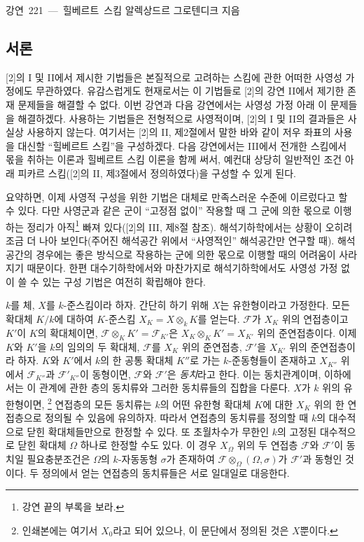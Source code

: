 \unit{강연 221 — 힐베르트 스킴}
%
  {알렉상드르 그로텐디크 지음}

\subsection*{서론}

[2]의 I 및 II에서 제시한 기법들은 본질적으로 고려하는 스킴에 관한
어떠한 사영성 가정에도 무관하였다. 유감스럽게도 현재로서는 이 기법들로
[2]의 강연 II에서 제기한 존재 문제들을 해결할 수 없다. 이번 강연과
다음 강연에서는 사영성 가정 아래 이 문제들을 해결하겠다. 사용하는
기법들은 전형적으로 사영적이며, [2]의 I 및 II의 결과들은 사실상 사용하지
않는다. 여기서는 [2]의 II, 제2절에서 말한 바와 같이 저우 좌표의 사용을
대신할 ``힐베르트 스킴''을 구성하겠다. 다음 강연에서는 III에서 전개한
스킴에서 몫을 취하는 이론과 힐베르트 스킴 이론을 함께 써서, 예컨대
상당히 일반적인 조건 아래 피카르 스킴([2]의 II, 제3절에서 정의하였다)을
구성할 수 있게 된다.

요약하면, 이제 사영적 구성을 위한 기법은 대체로 만족스러운 수준에
이르렀다고 할 수 있다. 다만 사영군과 같은 군이 ``고정점 없이'' 작용할 때
그 군에 의한 몫으로 이행하는 정리가 아직\footnote{강연 끝의 부록을 보라.}
빠져 있다([2]의 III, 제8절 참조). 해석기하학에서는 상황이 오히려 조금 더
나아 보인다(주어진 해석공간 위에서 ``사영적인'' 해석공간만 연구할 때).
해석공간의 경우에는 좋은 방식으로 작용하는 군에 의한 몫으로 이행할 때의
어려움이 사라지기 때문이다. 한편 대수기하학에서와 마찬가지로 해석기하학에서도
사영성 가정 없이 쓸 수 있는 구성 기법은 여전히 확립해야 한다.


$k$를 체, $X$를 $k$-준스킴이라 하자. 간단히 하기 위해 $X$는 유한형이라고
가정한다. 모든 확대체 $K/k$에 대하여 $K$-준스킴
$X_K=X\otimes_k K$를 얻는다. $\mathcal F$가 $X_K$ 위의 연접층이고
$K'$이 $K$의 확대체이면,
$\mathcal F\otimes_K K'=\mathcal F_{K'}$은
$X_K\otimes_K K'=X_{K'}$ 위의 준연접층이다. 이제 $K$와 $K'$을 $k$의
임의의 두 확대체, $\mathcal F$를 $X_K$ 위의 준연접층, $\mathcal F'$을
$X_{K'}$ 위의 준연접층이라 하자. $K$와 $K'$에서 $k$의 한 공통 확대체
$K''$로 가는 $k$-준동형들이 존재하고 $X_{K''}$ 위에서
$\mathcal F_{K''}$과 $\mathcal F'_{K''}$이 동형이면, $\mathcal F$와
$\mathcal F'$은 \emph{동치}라고 한다. 이는 동치관계이며, 이하에서는 이
관계에 관한 층의 동치류와 그러한 동치류들의 집합을 다룬다. $X$가 $k$
위의 유한형이면,
\footnote{인쇄본에는 여기서 $X_0$라고 되어 있으나, 이 문단에서 정의된 것은
$X$뿐이다.} 연접층의 모든 동치류는 $k$의 어떤 유한형 확대체 $K$에 대한
$X_K$ 위의 한 연접층으로 정의될 수 있음에 유의하자. 따라서 연접층의
동치류를 정의할 때 $k$의 대수적으로 닫힌 확대체들만으로 한정할 수 있다.
또 초월차수가 무한인 $k$의 고정된 대수적으로 닫힌 확대체 $\Omega$ 하나로
한정할 수도 있다. 이 경우 $X_\Omega$ 위의 두 연접층 $\mathcal F$와
$\mathcal F'$이 동치일 필요충분조건은 $\Omega$의 $k$-자동동형
$\sigma$가 존재하여 $\mathcal F\otimes_\Omega(\Omega,\sigma)$가
$\mathcal F'$과 동형인 것이다. 두 정의에서 얻는 연접층의 동치류들은
서로 일대일로 대응한다.

